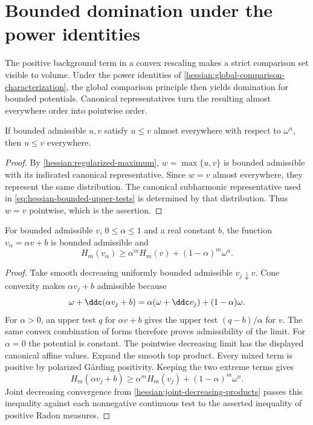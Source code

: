 \section{Bounded domination under the power identities}
\label{draft629:bounded-domination}

The positive background term in a convex rescaling makes a strict
comparison set visible to volume. Under the power identities of
\cref{hessian:global-comparison-characterization}, the global comparison
principle then yields domination for bounded potentials. Canonical
representatives turn the resulting almost everywhere order into
pointwise order.

\begin{lemma}\label{draft629:canonical-order}
If bounded admissible $u,v$ satisfy $u\leq v$ almost everywhere
with respect to $\omega^n$, then $u\leq v$ everywhere.
\end{lemma}
\begin{proof}
By \cref{hessian:regularized-maximum}, $w=\max\{u,v\}$ is bounded
admissible with its indicated canonical representative. Since
$w=v$ almost everywhere, they represent the same distribution.
The canonical subharmonic representative used in
\eqref{eq:hessian-bounded-upper-tests} is determined by that
distribution. Thus $w=v$ pointwise, which is the assertion.
\end{proof}

\begin{lemma}\label{draft629:convex-background-term}
For bounded admissible $v$, $0\leq\alpha\leq1$ and a real constant
$b$, the function $v_\alpha=\alpha v+b$ is bounded admissible and
\[
 H_m(v_\alpha)\geq\alpha^m H_m(v)+(1-\alpha)^m\omega^n.
\]
\end{lemma}
\begin{proof}
Take smooth decreasing uniformly bounded admissible $v_j\downarrow v$.
Cone convexity makes $\alpha v_j+b$ admissible because
\[
 \omega+\ddc(\alpha v_j+b)
        =\alpha(\omega+\ddc v_j)+(1-\alpha)\omega.
\]
For $\alpha>0$, an upper test $q$ for $\alpha v+b$ gives the
upper test $(q-b)/\alpha$ for $v$. The same convex combination
of forms therefore proves admissibility of the limit. For
$\alpha=0$ the potential is constant. The pointwise decreasing
limit has the displayed canonical affine values.
Expand the smooth top product. Every mixed term is positive by
polarized G\aa rding positivity. Keeping the two extreme terms gives
\[
 H_m(\alpha v_j+b)\geq\alpha^m H_m(v_j)
                                    +(1-\alpha)^m\omega^n.
\]
Joint decreasing convergence from
\cref{hessian:joint-decreasing-products} passes this inequality
against each nonnegative continuous test to the asserted inequality
of positive Radon measures.
\end{proof}

